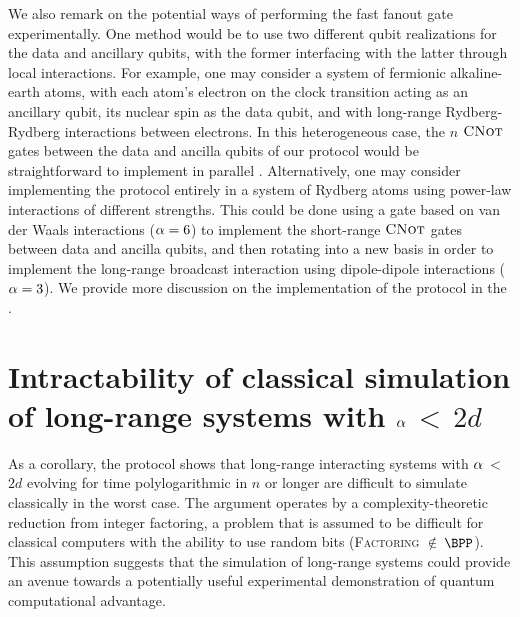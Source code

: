 We also remark on the potential ways of performing the fast fanout gate experimentally.
One method would be to use two different qubit realizations for the data and ancillary qubits,  with the former interfacing with the latter through local interactions.
For example, one may consider a system of fermionic alkaline-earth atoms, with each atom's electron on the clock transition acting as an ancillary qubit, its nuclear spin as the data qubit, and with long-range Rydberg-Rydberg interactions between electrons.
In this heterogeneous case, the $n$ $\textsc{CNot}$ gates between the data and ancilla qubits of our protocol would be straightforward to implement in parallel \cite{Gorshkov2009}.
Alternatively, one may consider implementing the protocol entirely in a system of Rydberg atoms using power-law interactions of different strengths.
This could be done using a gate based on %
van der Waals interactions ($\alpha = 6$) to implement the short-range $\textsc{CNot}$ gates between data and ancilla qubits, and then rotating into a new basis in order to implement the long-range broadcast interaction using dipole-dipole interactions ($\alpha = 3$).
We provide more discussion on the implementation of the protocol in the \cite{app:qfo}.

\section{Intractability of classical simulation of long-range systems with $\alpha$\,$<$\,$2d$}
As a corollary, the protocol shows that long-range interacting systems with $\alpha$\,$<$\,$2d$ evolving for time polylogarithmic in $n$ or longer are difficult to simulate classically in the worst case.
The argument operates by a complexity-theoretic reduction from integer factoring, a problem that is assumed to be difficult for classical computers with the ability to use random bits (\textsc{Factoring} $\notin$\,$\BPP$).
This assumption suggests that the simulation of long-range systems could provide an avenue towards a potentially useful experimental demonstration of quantum computational advantage.

